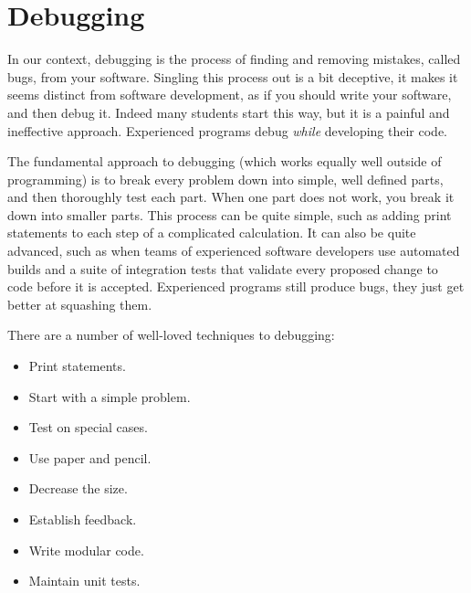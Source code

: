 \chapter{Debugging}

In our context, debugging is the process of finding and removing
mistakes, called bugs, from your software.  Singling this process out
is a bit deceptive, it makes it seems distinct from software
development, as if you should write your software, and then debug it.
Indeed many students start this way, but it is a painful and
ineffective approach.  Experienced programs debug {\em while} developing
their code.

The fundamental approach to debugging (which works equally well
outside of programming) is to break every problem down into simple,
well defined parts, and then thoroughly test each part.  When one part
does not work, you break it down into smaller parts.  This process can
be quite simple, such as adding print statements to each step of a
complicated calculation.  It can also be quite advanced, such as when
teams of experienced software developers use automated builds and a
suite of integration tests that validate every proposed change to code
before it is accepted.  Experienced programs still produce bugs, they
just get better at squashing them.

There are a number of well-loved techniques to debugging:
\begin{itemize}
\item Print statements.
\item Start with a simple problem.
\item Test on special cases.
\item Use paper and pencil.
\item Decrease the size.
\item Establish feedback.
\item Write modular code.
\item Maintain unit tests.
\end{itemize}

